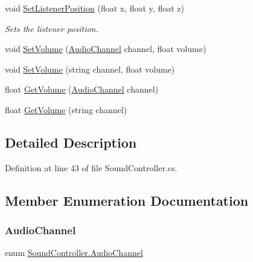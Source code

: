 \begin{DoxyCompactItemize}
void \hyperlink{class_sound_controller_a02a53f22822d6e4adf9c3e21ee9e62ee}{Set\+Listener\+Position} (float x, float y, float z)
\begin{DoxyCompactList}\small\item\em Sets the listener position. \end{DoxyCompactList}\item 
void \hyperlink{class_sound_controller_a96c4764ba53323ca7136a04423e19b59}{Set\+Volume} (\hyperlink{class_sound_controller_a1decb27e541146cfadf5becf24e5fa1b}{Audio\+Channel} channel, float volume)
\item 
void \hyperlink{class_sound_controller_a07ee1ed4defecdd71d576c3349ccbc4c}{Set\+Volume} (string channel, float volume)
\item 
float \hyperlink{class_sound_controller_acfb82e2e50283a3298a8b70250830072}{Get\+Volume} (\hyperlink{class_sound_controller_a1decb27e541146cfadf5becf24e5fa1b}{Audio\+Channel} channel)
\item 
float \hyperlink{class_sound_controller_aeaf20fc1bf450d878339868631689441}{Get\+Volume} (string channel)
\end{DoxyCompactItemize}


\subsection{Detailed Description}


Definition at line 43 of file Sound\+Controller.\+cs.



\subsection{Member Enumeration Documentation}
\mbox{\label{class_sound_controller_a1decb27e541146cfadf5becf24e5fa1b}} 
\subsubsection{\texorpdfstring{Audio\+Channel}{AudioChannel}}
{\footnotesize\ttfamily enum \hyperlink{class_sound_controller_a1decb27e541146cfadf5becf24e5fa1b}{Sound\+Controller.\+Audio\+Channel}\hspace{0.3cm}{\ttfamily [strong]}}

